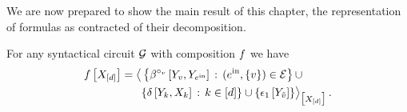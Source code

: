 We are now prepared to show the main result of this chapter, the representation of formulas as contracted \basisEncoding{} of their decomposition.

\begin{theorem}
    \label{the:formulaDecompositionRep}
    For any syntactical circuit $\mathcal{G}$ with composition $f$ we have
    \begin{align*}
        \exformulaat{\shortcatvariables}
        = \breakablecontractionof{
            &\left\{
                 \bencodingofat{\connectiveof{\node}}{\headvariableof{\node},\headvariableof{\incomingnodes}} \wcols (\incomingnodes,\{\node\})\in\edges
            \right\} \cup \\
            & \{\identityat{\headvariableof{\atomenumerator},\catvariableof{\atomenumerator}} \wcols \atomenumeratorin\}
            \cup \{\tbasisat{\headvariableof{\secnode}}\}
        }{\shortcatvariables} \, .
    \end{align*}
\end{theorem}
